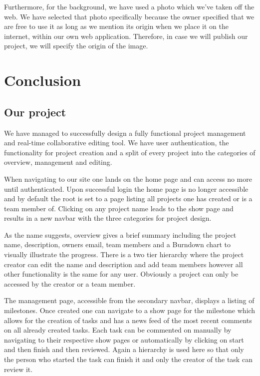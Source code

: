 \documentclass[a4wide, 11pt]{article}
\begin{document}
Furthermore, for the background, we have used a photo which we've taken off the
web. We have selected that photo specifically because the owner specified that
we are free to use it as long as we mention its origin when we place it on the
internet, within our own web application. Therefore, in case we will publish
our project, we will specify the origin of the image.

\clearpage

\section{Conclusion}

\subsection{Our project}
We have managed to successfully design a fully functional project management and real-time collaborative editing tool. We have user authentication, the functionality for project creation and a  split of every project into the categories of overview, management and editing. 

When navigating to our site one lands on the home page and can access no more until authenticated. Upon successful login the home page is no longer accessible and by default the root is set to a page listing all projects one has created or is a team member of. Clicking on any project name leads to the show page and results in a new navbar with the three categories for project design.

As the name suggests, overview gives a brief summary including the project name, description, owners email, team members and a Burndown chart to visually illustrate the progress. There is a two tier hierarchy where the project creator can edit the name and description and add team members however all other functionality is the same for any user. Obviously a project can only be accessed by the creator or a team member. 

The management page, accessible from the secondary navbar, displays a listing of milestones. Once created one can navigate to a show page for the milestone which allows for the creation of tasks and has a news feed of the most recent comments on all already created tasks. Each task can be commented on manually by navigating to their respective show pages or automatically by clicking on start and then finish and then reviewed. Again a hierarchy is used here so that only the person who started the task can finish it and only the creator of the task can review it.
\end{document}
